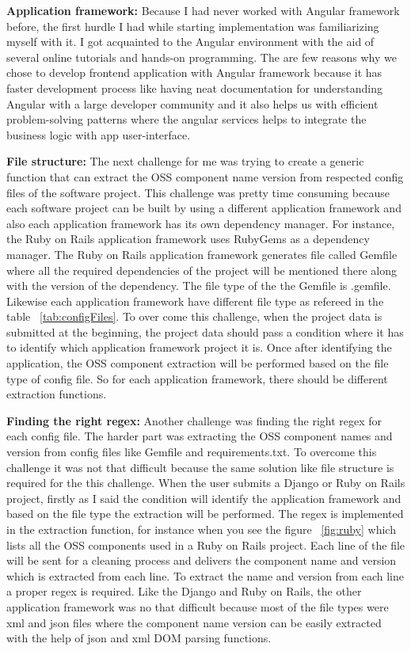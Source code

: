 \textbf{Application framework:} Because I had never worked with Angular framework before, the first hurdle I had while starting implementation was familiarizing myself with it. I got acquainted to the Angular environment with the aid of several online tutorials and hands-on programming. The are few reasons why we chose to develop frontend application with  Angular framework because it has faster development process like having neat documentation for understanding Angular with a large developer community and it also helps us with efficient problem-solving patterns where the angular services helps to integrate the business logic with app user-interface.
	
\textbf{File structure:} The next challenge for me was trying to create a generic function that can extract the \acs{OSS} component name version from respected config files of the software project. This challenge was pretty time consuming because each software project can be built by using a different application framework and also each application framework has its own dependency manager. For instance, the Ruby on Rails application framework uses RubyGems as a dependency manager. The Ruby on Rails application framework generates file called Gemfile where all the required dependencies of the project will be mentioned there along with the version of the dependency. The file type of the the Gemfile is .gemfile.  Likewise each application framework have different file type as refereed in the table ~\ref{tab:configFiles}. To over come this challenge, when the project data is submitted at the beginning, the project data should pass a condition where it has to identify which application framework project it is. Once after identifying the application, the OSS component extraction will be performed based on the file type of config file. So for each application framework, there should be different extraction functions. 
	
	
\textbf{Finding the right regex:} Another challenge was finding the right regex for each config file. The harder part was extracting the \acs{OSS} component names and version from config files like Gemfile and requirements.txt. To overcome this challenge it was not that difficult because the same solution like file structure is required for the this challenge. When the user submits a Django or Ruby on Rails project, firstly as I said the condition will identify the application framework and based on the file type the extraction will be performed. The regex is implemented in the extraction function, for instance when you see the figure ~\ref{fig:ruby} which lists all the OSS components used in a Ruby on Rails project. Each line of the file will be sent for a cleaning process and delivers the component name and version which is extracted from each line. To extract the name and version from each line a proper regex is required. Like the Django and Ruby on Rails, the other application framework was no that difficult because most of the file types were xml and json files where the component name version can be easily extracted with the help of json and xml DOM parsing functions.  
	
